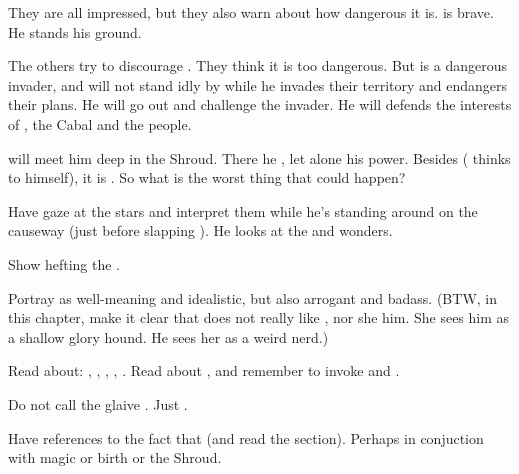 \begin{changes}
    They are all impressed, but they also warn \Teshrial about how dangerous it is.
    \Teshrial is brave. 
    He stands his ground. 
    
    The others try to discourage \Teshrial.
    They think it is too dangerous. 
    But \Ishnaruchaefir{} is a dangerous invader, and \Teshrial{} will not stand idly by while he invades their territory and endangers their plans. 
    He will go out and challenge the invader. 
    He will defends the interests of \CiriathSepher, the Cabal and the \resphan{} people. 
    
    \Teshrial{} will meet him deep in the Shroud. 
    There he , let alone his \xsic{} power. 
    Besides (\Teshrial{} thinks to himself), it is . 
    So what is the worst thing that could happen?  
    
    Have \Teshrial{} gaze at the stars and interpret them while he's standing around on the causeway (just before slapping \Achsah). 
    He looks at the  and wonders. 
    
    Show \Teshrial{} hefting the \senaan{} . 
    
    Portray \Teshrial as well-meaning and idealistic, but also arrogant and badass. 
    (BTW, in this chapter, make it clear that \Teshrial does not really like \Urizeth, nor she him.
    She sees him as a shallow glory hound.
    He sees her as a weird nerd.)
  
  \begin{comment}\paragraph{What Slithers Beneath}\end{comment}
    
    Read about: 
      ,
      ,
      ,
      ,
      . 
    Read about , and remember to invoke \Sethicus and \Tiamat. 
    
    Do not call the glaive \quo{\Rystessakhin}. 
    Just .
    
    Have references to the fact that  (and read the section). 
    Perhaps in conjuction with magic or birth or the Shroud. 
    

\end{changes}
